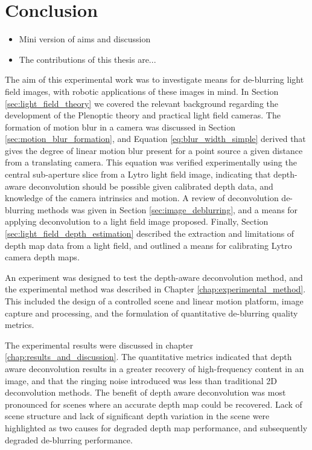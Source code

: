 
\chapter{Conclusion}
\label{chap:conclusion}

\begin{itemize}
\item Mini version of aims and discussion
\item The contributions of this thesis are...
\end{itemize}

The aim of this experimental work was to investigate means for de-blurring light field images, with robotic applications of these images in mind.
In Section \ref{sec:light_field_theory} we covered the relevant background regarding the development of the Plenoptic theory and practical light field cameras.
The formation of motion blur in a camera was discussed in Section \ref{sec:motion_blur_formation}, and Equation \ref{eq:blur_width_simple} derived that gives the degree of linear motion blur present for a point source a given distance from a translating camera.
This equation was verified experimentally using the central sub-aperture slice from a Lytro light field image, indicating that depth-aware deconvolution should be possible given calibrated depth data, and knowledge of the camera intrinsics and motion.
A review of deconvolution de-blurring methods was given in Section \ref{sec:image_deblurring}, and a means for applying deconvolution to a light field image proposed.
Finally, Section \ref{sec:light_field_depth_estimation} described the extraction and limitations of depth map data from a light field, and outlined a means for calibrating Lytro camera depth maps.

An experiment was designed to test the depth-aware deconvolution method, and the experimental method was described in Chapter \ref{chap:experimental_method}.
This included the design of a controlled scene and linear motion platform, image capture and processing, and the formulation of quantitative de-blurring quality metrics.

The experimental results were discussed in chapter \ref{chap:results_and_discussion}.
The quantitative metrics indicated that depth aware deconvolution results in a greater recovery of high-frequency content in an image, and that the ringing noise introduced was less than traditional 2D deconvolution methods.
The benefit of depth aware deconvolution was most pronounced for scenes where an accurate depth map could be recovered.
Lack of scene structure and lack of significant depth variation in the scene were highlighted as two causes for degraded depth map performance, and subsequently degraded de-blurring performance.

